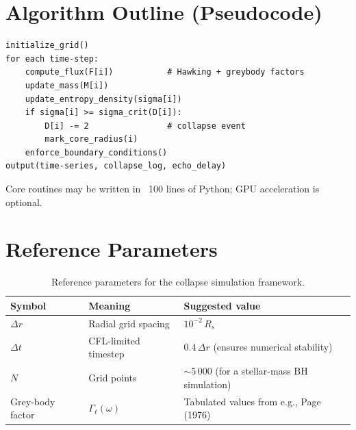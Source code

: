 \documentclass[a4paper, 12pt, oneside]{book}
\numberwithin{equation}{chapter}
\begin{document}
\section{Algorithm Outline (Pseudocode)}
\label{sec:Pseudocode}
\begin{verbatim}
initialize_grid()
for each time-step:
    compute_flux(F[i])           # Hawking + greybody factors
    update_mass(M[i])
    update_entropy_density(sigma[i])
    if sigma[i] >= sigma_crit(D[i]):
        D[i] -= 2                # collapse event
        mark_core_radius(i)
    enforce_boundary_conditions()
output(time-series, collapse_log, echo_delay)
\end{verbatim}

Core routines may be written in ~100 lines of Python;  
GPU acceleration is optional.

\section{Reference Parameters}
\label{sec:RefParams}

\begin{table}[htbp]
\centering
\caption{Reference parameters for the collapse simulation framework.}
\label{tab:refParams} %
\begin{tabularx}{\textwidth}{@{} l l >{\raggedright\arraybackslash}X @{}}  %
\toprule
\textbf{Symbol} & \textbf{Meaning} & \textbf{Suggested value} \\
\midrule
$\Delta r$ & Radial grid spacing & $10^{-2}\,R_s$ \\
$\Delta t$ & CFL-limited timestep & $0.4\,\Delta r$ (ensures numerical stability) \\ %
$N$ & Grid points & $\sim 5\,000$ (for a stellar-mass BH simulation) \\ %
Grey-body factor & $\Gamma_\ell(\omega)$ & Tabulated values from e.g., Page (1976) \cite{Page1976} \\ %
\bottomrule
\end{tabularx}
\end{table}
\end{document}

